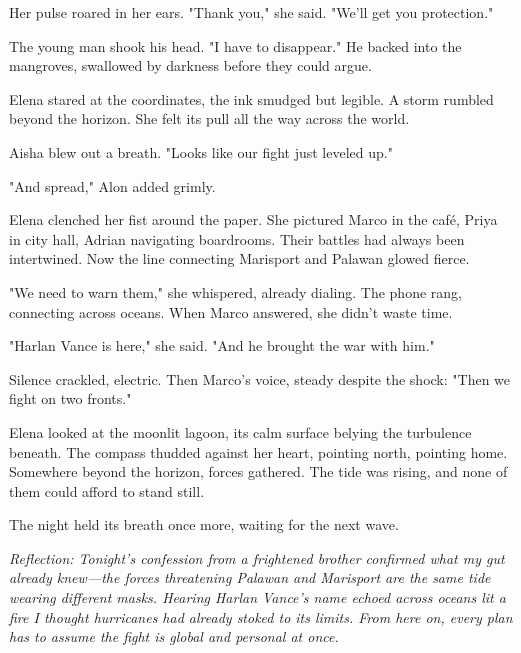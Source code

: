 Her pulse roared in her ears. "Thank you," she said. "We'll get you protection."

The young man shook his head. "I have to disappear." He backed into the mangroves, swallowed by darkness before they could argue.

Elena stared at the coordinates, the ink smudged but legible. A storm rumbled beyond the horizon. She felt its pull all the way across the world.

Aisha blew out a breath. "Looks like our fight just leveled up."

"And spread," Alon added grimly.

Elena clenched her fist around the paper. She pictured Marco in the café, Priya in city hall, Adrian navigating boardrooms. Their battles had always been intertwined. Now the line connecting Marisport and Palawan glowed fierce.

"We need to warn them," she whispered, already dialing. The phone rang, connecting across oceans. When Marco answered, she didn't waste time.

"Harlan Vance is here," she said. "And he brought the war with him."

Silence crackled, electric. Then Marco's voice, steady despite the shock: "Then we fight on two fronts."

Elena looked at the moonlit lagoon, its calm surface belying the turbulence beneath. The compass thudded against her heart, pointing north, pointing home. Somewhere beyond the horizon, forces gathered. The tide was rising, and none of them could afford to stand still.

The night held its breath once more, waiting for the next wave.

\noindent\textit{Reflection: Tonight's confession from a frightened brother confirmed what my gut already knew—the forces threatening Palawan and Marisport are the same tide wearing different masks. Hearing Harlan Vance's name echoed across oceans lit a fire I thought hurricanes had already stoked to its limits. From here on, every plan has to assume the fight is global and personal at once.}
